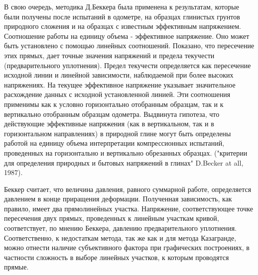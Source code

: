 В свою очередь, методика Д.Беккера была применена к результатам, которые были получены после испытаний в одометре, на образцах глинистых грунтов природного сложения и на образцах с известным эффективным напряжением. Соотношение работы на единицу объема - эффективное напряжение. Оно может быть установлено с помощью линейных соотношений. Показано, что пересечение этих прямых, дает точные значения напряжений и предела текучести (предварительного уплотнения). Предел текучести определяется как пересечение исходной линии и линейной зависимости, наблюдаемой при более высоких напряжениях. На текущее эффективное напряжение указывает значительное расхождение данных с исходной установленной линией. Эти соотношения применимы как к условно горизонтально отобранным образцам, так и к вертикально отобранным образцам одометра. Выдвинута гипотеза, что действующие эффективные напряжения (как в вертикальном, так и в горизонтальном направлениях) в природной глине могут быть определены работой на единицу объема интерпретации компрессионных испытаний, проведенных на горизонтально и вертикально обрезанных образцах. ("критерии для определения природных и бытовых напряжений в глинах" D.Becker at all, 1987).

Беккер считает, что величина давления, равного суммарной работе, определяется давлением в конце приращения деформации. Полученная зависимость, как правило, имеет два прямолинейных участка. Напряжение, соответствующее точке пересечения двух прямых, проведенных к линейным участкам кривой, соответствует, по мнению Беккера, давлению предварительного уплотнения.
Соответственно, к недостаткам метода, так же как и для метода Казагранде, можно отнести наличие субъективного фактора при графических построениях, в частности сложность в выборе линейных участков, к которым проводятся прямые. 
